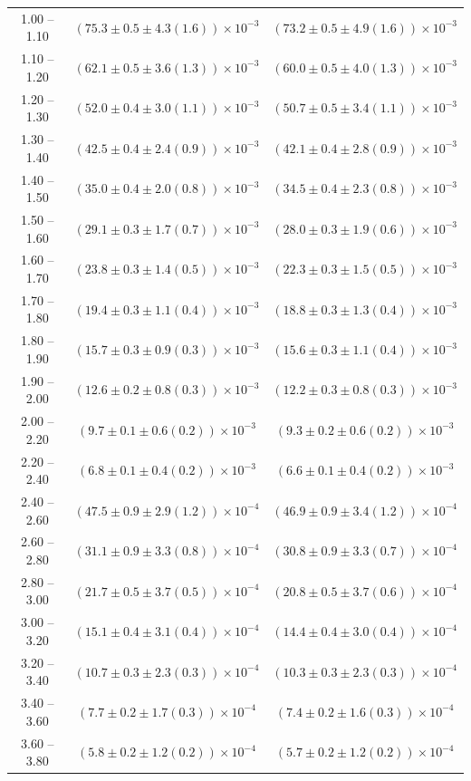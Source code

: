 \begin{table}
\begin{center}
\begin{tabular}{ c | c c }
1.00 -- 1.10 & $(75.3\pm0.5\pm4.3(1.6))\times10^{-3}$ & $(73.2\pm0.5\pm4.9(1.6))\times10^{-3}$ \\ 
1.10 -- 1.20 & $(62.1\pm0.5\pm3.6(1.3))\times10^{-3}$ & $(60.0\pm0.5\pm4.0(1.3))\times10^{-3}$ \\ 
1.20 -- 1.30 & $(52.0\pm0.4\pm3.0(1.1))\times10^{-3}$ & $(50.7\pm0.5\pm3.4(1.1))\times10^{-3}$ \\ 
1.30 -- 1.40 & $(42.5\pm0.4\pm2.4(0.9))\times10^{-3}$ & $(42.1\pm0.4\pm2.8(0.9))\times10^{-3}$ \\ 
1.40 -- 1.50 & $(35.0\pm0.4\pm2.0(0.8))\times10^{-3}$ & $(34.5\pm0.4\pm2.3(0.8))\times10^{-3}$ \\ 
1.50 -- 1.60 & $(29.1\pm0.3\pm1.7(0.7))\times10^{-3}$ & $(28.0\pm0.3\pm1.9(0.6))\times10^{-3}$ \\ 
1.60 -- 1.70 & $(23.8\pm0.3\pm1.4(0.5))\times10^{-3}$ & $(22.3\pm0.3\pm1.5(0.5))\times10^{-3}$ \\ 
1.70 -- 1.80 & $(19.4\pm0.3\pm1.1(0.4))\times10^{-3}$ & $(18.8\pm0.3\pm1.3(0.4))\times10^{-3}$ \\ 
1.80 -- 1.90 & $(15.7\pm0.3\pm0.9(0.3))\times10^{-3}$ & $(15.6\pm0.3\pm1.1(0.4))\times10^{-3}$ \\ 
1.90 -- 2.00 & $(12.6\pm0.2\pm0.8(0.3))\times10^{-3}$ & $(12.2\pm0.3\pm0.8(0.3))\times10^{-3}$ \\ 
2.00 -- 2.20 & $(9.7\pm0.1\pm0.6(0.2))\times10^{-3}$ & $(9.3\pm0.2\pm0.6(0.2))\times10^{-3}$ \\ 
2.20 -- 2.40 & $(6.8\pm0.1\pm0.4(0.2))\times10^{-3}$ & $(6.6\pm0.1\pm0.4(0.2))\times10^{-3}$ \\ 
2.40 -- 2.60 & $(47.5\pm0.9\pm2.9(1.2))\times10^{-4}$ & $(46.9\pm0.9\pm3.4(1.2))\times10^{-4}$ \\ 
2.60 -- 2.80 & $(31.1\pm0.9\pm3.3(0.8))\times10^{-4}$ & $(30.8\pm0.9\pm3.3(0.7))\times10^{-4}$ \\ 
2.80 -- 3.00 & $(21.7\pm0.5\pm3.7(0.5))\times10^{-4}$ & $(20.8\pm0.5\pm3.7(0.6))\times10^{-4}$ \\ 
3.00 -- 3.20 & $(15.1\pm0.4\pm3.1(0.4))\times10^{-4}$ & $(14.4\pm0.4\pm3.0(0.4))\times10^{-4}$ \\ 
3.20 -- 3.40 & $(10.7\pm0.3\pm2.3(0.3))\times10^{-4}$ & $(10.3\pm0.3\pm2.3(0.3))\times10^{-4}$ \\ 
3.40 -- 3.60 & $(7.7\pm0.2\pm1.7(0.3))\times10^{-4}$ & $(7.4\pm0.2\pm1.6(0.3))\times10^{-4}$ \\ 
3.60 -- 3.80 & $(5.8\pm0.2\pm1.2(0.2))\times10^{-4}$ & $(5.7\pm0.2\pm1.2(0.2))\times10^{-4}$ \\ 

\end{tabular}
\end{center}
\end{table}
